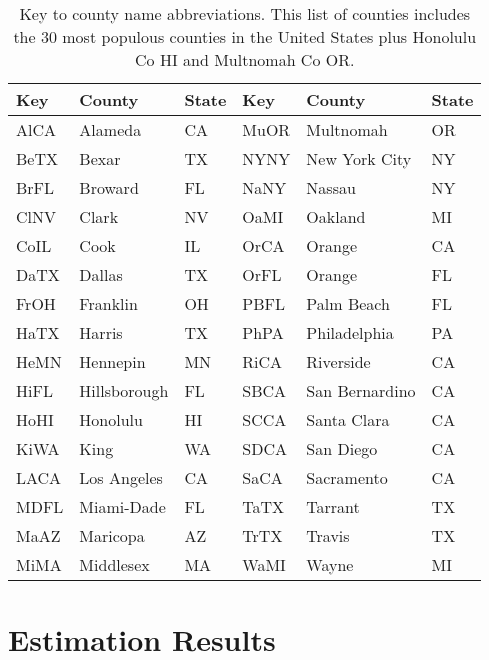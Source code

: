 \documentclass[12pt,letterpaper]{article}
\begin{document}
{\begin{appendices}
\begin{table}[!ht]
\caption{\label{tab:namekey}
Key to county name abbreviations. This list of counties includes the
30 most populous counties in the United States plus Honolulu Co HI and
Multnomah Co OR.
}
\centering
\begin{tabular}{lll||lll}
\hline
Key&County&State&Key&County&State\\
\hline
AlCA&Alameda&CA&MuOR&Multnomah&OR\\
BeTX&Bexar&TX&NYNY&New York City&NY\\
BrFL&Broward&FL&NaNY&Nassau&NY\\
ClNV&Clark&NV&OaMI&Oakland&MI\\
CoIL&Cook&IL&OrCA&Orange&CA\\
DaTX&Dallas&TX&OrFL&Orange&FL\\
FrOH&Franklin&OH&PBFL&Palm Beach&FL\\
HaTX&Harris&TX&PhPA&Philadelphia&PA\\
HeMN&Hennepin&MN&RiCA&Riverside&CA\\
HiFL&Hillsborough&FL&SBCA&San Bernardino&CA\\
HoHI&Honolulu&HI&SCCA&Santa Clara&CA\\
KiWA&King&WA&SDCA&San Diego&CA\\
LACA&Los Angeles&CA&SaCA&Sacramento&CA\\
MDFL&Miami-Dade&FL&TaTX&Tarrant&TX\\
MaAZ&Maricopa&AZ&TrTX&Travis&TX\\
MiMA&Middlesex&MA&WaMI&Wayne&MI\\
\hline
\end{tabular}

\end{table}
\clearpage

\section{Estimation Results}


\end{appendices}}
\end{document}
